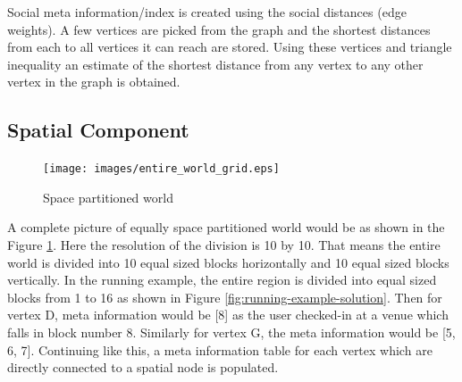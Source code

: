 
Social meta information/index is created using the social distances (edge weights). A few vertices are picked from the graph and the shortest distances from each to all vertices it can reach are stored. Using these vertices and triangle inequality an estimate of the shortest distance from any vertex to any other vertex in the graph is obtained.

\subsection{Spatial Component}

\begin{figure}[t]
	\centering \texttt{[image: images/entire\_world\_grid.eps]}
    \caption{Space partitioned world}
    \label{fig:space-partitioned}
\end{figure}

A complete picture of equally space partitioned world would be as shown in the Figure \ref{fig:space-partitioned}. Here the resolution of the division is 10 by 10. That means the entire world is divided into 10 equal sized blocks horizontally and 10 equal sized blocks vertically. In the running example, the entire region is divided into equal sized blocks from 1 to 16 as shown in Figure \ref{fig:running-example-solution}. Then for vertex D, meta information would be [8] as the user checked-in at a venue which falls in block number 8. Similarly for vertex G, the meta information would be [5, 6, 7]. Continuing like this, a meta information table for each vertex which are directly connected to a spatial node is populated.


